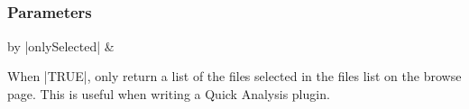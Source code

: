 \documentclass{report}
\begin{document}
\clearpage
\subsection{}
\subsubsection{Parameters}
\begin{table}[h]
\begin{center}
\begin{tabular}{by}
		|onlySelected| & \begin{minipage}[t]{0.8\columnwidth}When |TRUE|, only return a list of the files selected in the files list on the browse page. This is useful when writing a Quick Analysis plugin.\end{minipage}\\
	\end{tabular}
\end{center}
\end{table}
\end{document}
